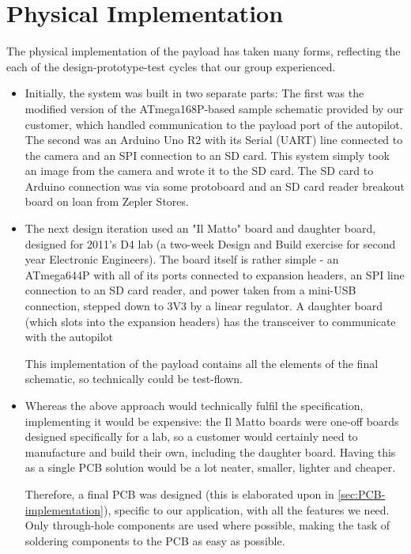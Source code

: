 \section{Physical Implementation}

The physical implementation of the payload has taken many forms, reflecting 
the each of the design-prototype-test cycles that our group experienced.

\begin{itemize}
\item Initially, the system was built in two separate parts: The first was 
the modified version of the ATmega168P-based sample schematic provided by 
our customer, which handled communication to the payload port of the 
autopilot. The second was an Arduino Uno R2 with its Serial (UART) line 
connected to the camera and an SPI connection to an SD card. This system 
simply took an image from the camera and wrote it to the SD card. The SD card 
to Arduino connection was via some protoboard and an SD card reader breakout 
board on loan from Zepler Stores.
\item The next design iteration used an "Il Matto" board and daughter board, 
designed for 2011's D4 lab (a two-week Design and Build exercise for second 
year Electronic Engineers). The board itself is rather simple - an ATmega644P 
with all of its ports connected to expansion headers, an SPI line connection 
to an SD card reader, and power taken from a mini-USB connection, stepped 
down to 3V3 by a linear regulator. A daughter board (which slots into the 
expansion headers) has the transceiver to communicate with the autopilot

This implementation of the payload contains all the elements of the final 
schematic, so technically could be test-flown.
\item Whereas the above approach would technically fulfil the specification, 
implementing it would be expensive: the Il Matto boards were one-off boards 
designed specifically for a lab, so a customer would certainly need to 
manufacture and build their own, including the daughter board. Having this as 
a single PCB solution would be a lot neater, smaller, lighter and cheaper.

Therefore, a final PCB was designed (this is elaborated upon in 
\ref{sec:PCB-implementation}), specific to our application, with all the 
features we need. Only through-hole components are used where possible, 
making the task of soldering components to the PCB as easy as possible.
\end{itemize}